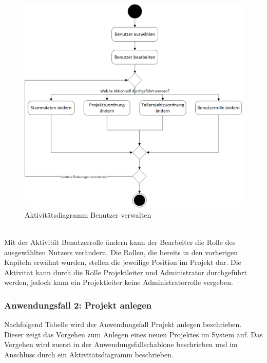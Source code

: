 \begin{figure}[h!]
    \centering
    \includegraphics[scale=0.67]{./Bilder/AD1_BenutzerVerwalten.png}
    \caption[Aktivitätsdiagramm Anwendungsfall 1]{Aktivitätsdiagramm Benutzer verwalten}
    \label{fig:AD1}
\end{figure}
\\Mit der Aktivität \glqq{}Benutzerrolle ändern\grqq{} kann der Bearbeiter die Rolle des ausgewählten Nutzers verändern. Die Rollen, die bereits in den vorherigen Kapiteln erwähnt wurden, stellen die jeweilige Position im Projekt dar. Die Aktivität kann durch die Rolle Projektleiter und Administrator durchgeführt werden, jedoch kann ein Projektleiter keine Administratorrolle vergeben.

\newpage
\subsubsection{Anwendungsfall 2: Projekt anlegen}
Nachfolgend Tabelle wird der Anwendungsfall \glqq{}Projekt anlegen\grqq{} beschrieben. Dieser zeigt das Vorgehen zum Anlegen eines neuen Projektes im System auf. Das Vorgehen wird zuerst in der Anwendungsfallschablone beschrieben und im Anschluss durch ein Aktivitätsdiagramm beschrieben.\\

